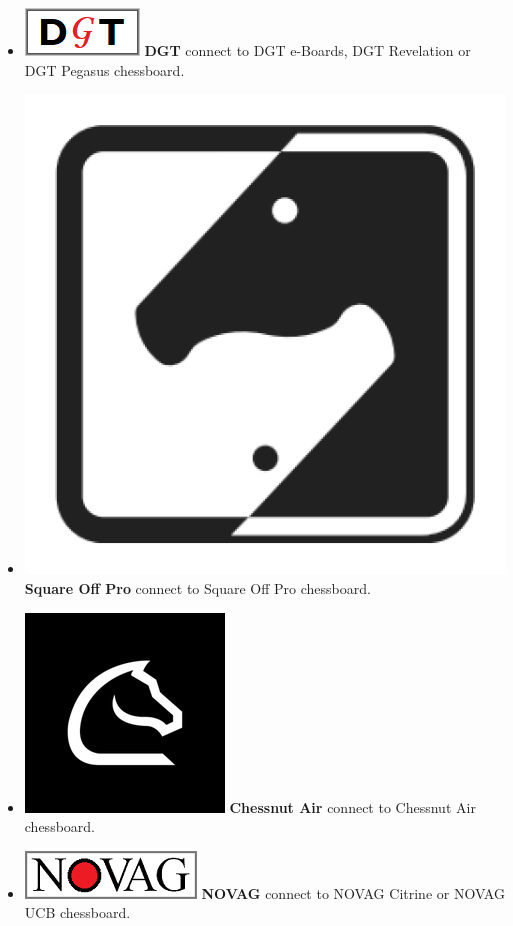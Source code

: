 \documentclass[11pt,a4paper]{article}
\begin{document}
\begin{itemize}
	\item  \includegraphics[scale=0.3]{dgt48.png} \textbf{DGT} connect to DGT e-Boards, DGT Revelation or DGT Pegasus chessboard.	
	\item  \includegraphics[scale=0.05]{squareoff.png} \textbf{Square Off Pro} connect to Square Off Pro chessboard.		
	\item  \includegraphics[scale=0.1]{chessnut.png} \textbf{Chessnut Air} connect to Chessnut Air chessboard.		
	\item  \includegraphics[scale=0.3]{novag48.PNG} \textbf{NOVAG} connect to NOVAG Citrine or NOVAG UCB chessboard.			

\end{itemize}
\end{document}
